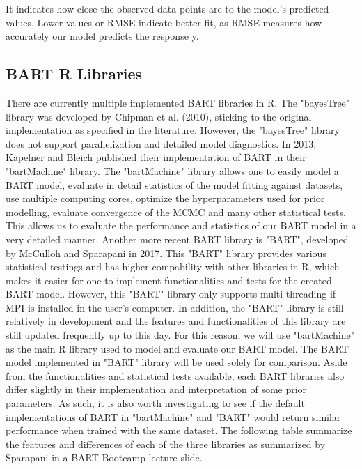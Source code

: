 \documentclass{usiinftr}
\begin{document}
It indicates how close the observed data points are to the model's predicted values. Lower values or RMSE indicate better fit, as RMSE measures how accurately our model predicts the response y.  

\subsection{BART R Libraries}
There are currently multiple implemented BART libraries in R. The "bayesTree" library was developed by Chipman et al. (2010), sticking to the original implementation as specified in the literature. However, the "bayesTree" library does not support parallelization and detailed model diagnostics. In 2013, Kapelner and Bleich published their implementation of BART in their "bartMachine" library. The "bartMachine" library allows one to easily model a BART model, evaluate in detail statistics of the model fitting against datasets, use multiple computing cores, optimize the hyperparameters used for prior modelling, evaluate convergence of the MCMC and many other statistical tests. This allows us to evaluate the performance and statistics of our BART model in a very detailed manner. Another more recent BART library is "BART", developed by McCulloh and Sparapani in 2017. This "BART" library provides various statistical testings and has higher compability with other libraries in R, which makes it easier for one to implement functionalities and tests for the created BART model. However, this "BART" library only supports multi-threading if MPI is installed in the user's computer. In addition, the "BART" library is still relatively in development and the features and functionalities of this library are still updated frequently up to this day. For this reason, we will use "bartMachine" as the main R library used to model and evaluate our BART model. The BART model implemented in "BART" library will be used solely for comparison. Aside from the functionalities and statistical tests available, each BART libraries also differ slightly in their implementation and interpretation of some prior parameters. As such, it is also worth investigating to see if the default implementations of BART in "bartMachine" and "BART" would return similar performance when trained with the same dataset. The following table summarize the features and differences of each of the three libraries as summarized by Sparapani in a BART Bootcamp lecture slide.
\end{document}

